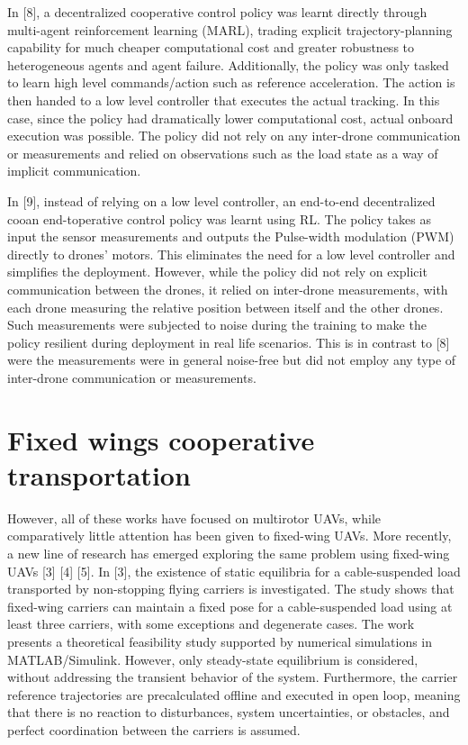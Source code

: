 In [8], a decentralized cooperative
control policy was learnt directly through multi-agent reinforcement
learning (MARL), trading explicit trajectory-planning capability for much
cheaper computational cost and greater robustness to heterogeneous agents
and agent failure. Additionally, the policy was only tasked to learn high level
commands/action such as reference acceleration. The action is then handed to 
a low level controller that executes the actual tracking. In this case, 
since the policy had dramatically lower computational cost, actual 
onboard execution was possible. The policy did not rely on any inter-drone 
communication or measurements and relied on observations such as the load 
state as a way of implicit communication.

In [9], instead of relying on a low level controller, an end-to-end 
decentralized cooan end-toperative control policy was learnt using RL. The policy takes as
input the sensor measurements and outputs the Pulse-width modulation (PWM) 
directly to drones' motors.
This eliminates the need for a low level controller and simplifies the 
deployment. However, while the policy did not rely on explicit communication
between the drones, it relied on inter-drone measurements, with each drone 
measuring the relative position between itself and the other drones. Such 
measurements were subjected to noise during the training to make the policy
resilient during deployment in real life scenarios. This is in contrast to [8]
were the measurements were in general noise-free but did not employ any type of
inter-drone communication or measurements.


\section{Fixed wings cooperative transportation}

However, all of these works have focused on multirotor UAVs, while
comparatively little attention has been given to fixed-wing UAVs. More
recently, a new line of research has emerged exploring the same problem
using fixed-wing UAVs [3] [4] [5]. In [3], the existence of static equilibria
for a cable-suspended load transported by non-stopping flying carriers is 
investigated. The study shows that fixed-wing carriers can maintain a fixed 
pose for a cable-suspended load using at least three carriers, with some 
exceptions and degenerate cases. The work presents a theoretical feasibility 
study supported by numerical simulations in MATLAB/Simulink. However, only 
steady-state equilibrium is considered, without addressing the transient 
behavior of the system. Furthermore, the carrier reference trajectories are 
precalculated offline and executed in open loop, meaning that there is no 
reaction to disturbances, system uncertainties, or obstacles, and perfect 
coordination between the carriers is assumed. 

